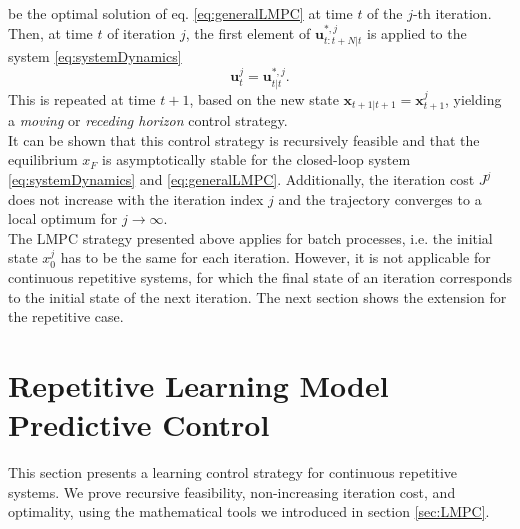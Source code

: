 be the optimal solution of eq. \ref{eq:generalLMPC} at time $t$ of the $j$-th iteration. Then, at time $t$ of iteration $j$, the first element of $\bm{u}_{t:t+N|t}^{*,j}$ is applied to the system \eqref{eq:systemDynamics}
\begin{equation}\label{eq:recHorizon}
\bm{u}_t^j = \bm{u}_{t|t}^{*,j}.
\end{equation}
This is repeated at time $t+1$, based on the new state $\bm{x}_{t+1|t+1}=\bm{x}_{t+1}^j$, yielding a \emph{moving} or \emph{receding horizon} control strategy.\\
It can be shown that this control strategy is recursively feasible and that the equilibrium $x_F$ is asymptotically stable for the closed-loop  system \eqref{eq:systemDynamics} and \eqref{eq:generalLMPC}. Additionally, the iteration cost $J^j$ does not increase with the iteration index $j$ and the trajectory converges to a local optimum for $j\rightarrow\infty$.\\
The LMPC strategy presented above applies for batch processes, i.e. the initial state $x_0^j$ has to be the same for each iteration. However, it is not applicable for continuous repetitive systems, for which the final state of an iteration corresponds to the initial state of the next iteration. The next section shows the extension for the repetitive case.

\section{Repetitive Learning Model Predictive Control}
This section presents a learning control strategy for continuous repetitive systems. We prove recursive feasibility, non-increasing iteration cost, and optimality, using the mathematical tools we introduced in section \ref{sec:LMPC}.\\

